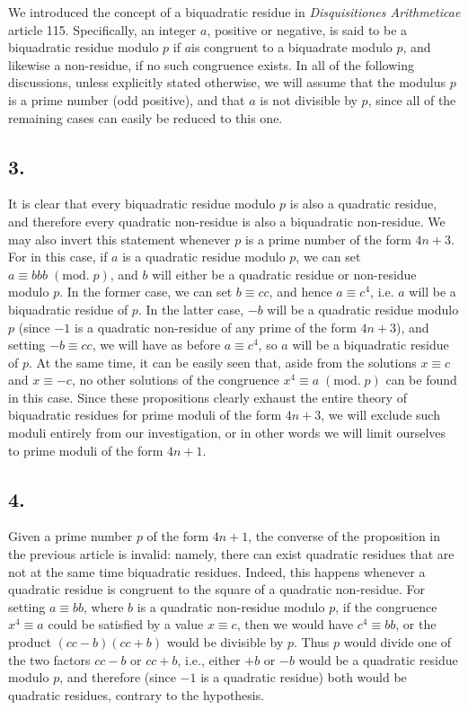 \documentclass[twoside,12pt]{memoir}
\renewcommand{\pmod}[1]{\;(\textrm{mod.}\;#1)}
\begin{document}
We introduced the concept of a biquadratic residue in \textit{Disquisitiones Arithmeticae} article 115.  Specifically, an integer \(a\), positive or negative, is said to be a biquadratic residue modulo \(p\) if \(a\)is congruent to a biquadrate modulo \(p\), and likewise a non-residue, if no such congruence exists. In all of the following discussions, unless explicitly stated otherwise, we will assume that the modulus \(p\) is a prime number (odd positive), and that \(a\) is not divisible by \(p\), since all of the remaining cases can easily be reduced to this one.
%

\subsection*{3.}

It is clear that every biquadratic residue modulo \(p\) is also a quadratic residue, and therefore every quadratic non-residue  is also a biquadratic non-residue. We may also invert this statement whenever \(p\) is a prime number of the form \(4n+3\). For in this case, if \(a\) is a quadratic residue modulo \(p\), we can set \(a \equiv bbb \pmod{p}\), and \(b\) will either be a quadratic residue or non-residue modulo \(p\). In the former case, we can set \(b \equiv c c\), and hence \(a \equiv c^{4}\), i{.}e{.} \(a\) will be a biquadratic residue of \(p\).  In the latter case, \(-b\) will be a quadratic residue modulo \(p\) (since \(-1\) is a quadratic non-residue of any prime of the form \(4n+3\)), and setting \(-b \equiv c c\), we will have as before \(a \equiv c^{4}\), so \(a\) will be a biquadratic residue of \(p\). At the same time, it can be easily seen that, aside from the solutions \(x \equiv c\) and \(x \equiv -c\), no other solutions of the congruence \(x^4 \equiv a \pmod{p}\) can be found in this case. Since these propositions clearly exhaust the entire theory of biquadratic residues for prime moduli of the form \(4n+3\), we will exclude such moduli entirely from our investigation, or in other words we will limit ourselves to prime moduli of the form \(4n+1\).
%

\subsection*{4.}

Given a prime number \(p\) of the form \(4n+1\), the converse of the proposition in the previous article is invalid: namely, there can exist quadratic residues that are not at the same time biquadratic residues.  Indeed, this happens whenever a quadratic residue is congruent to the square of a quadratic non-residue. For setting \(a \equiv bb\), where \(b\) is a quadratic non-residue modulo \(p\), if the congruence \(x^4 \equiv a\) could be satisfied by a value \(x \equiv c\), then we would have \(c^4 \equiv bb\), or the product \((cc-b)(cc+b)\) would be divisible by \(p\).  Thus \(p\) would divide one of the two factors \(cc-b\) or \(cc+b\), i{.}e{.}, either \(+b\) or \(-b\) would be a quadratic residue modulo \(p\), and therefore (since \(-1\) is a quadratic residue) both would be quadratic residues, contrary to the hypothesis.
 
\end{document}
